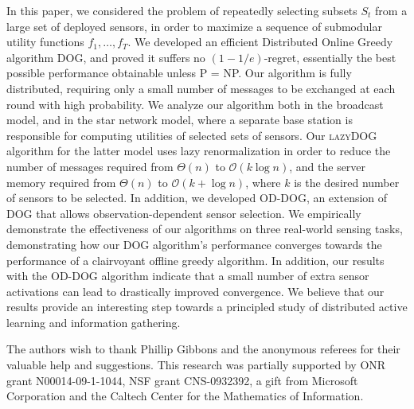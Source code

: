 \documentclass{sig-alternate-dan}
\numberwithin{equation}{section}
\newcommand{\algofont}[1]{\textsc{#1}}
\newcommand{\cO}{\mathcal{O}}
\newcommand{\oddog}{\algofont{OD-DOG}\xspace}
\newcommand{\dog}{\algofont{DOG}\xspace}
\newcommand{\lazydog}{\algofont{lazyDOG}\xspace}
\newcommand{\obj}{\ensuremath{f}} %
\newcommand{\K}{\ensuremath{k}}
\renewcommand{\paragraph}[1]{\vspace{3mm}\noindent{\bf #1.} }
\begin{document}
In this paper, we considered the problem of repeatedly selecting
subsets $S_{t}$ from a large set of deployed sensors, in order to
maximize a sequence of submodular utility functions
$\obj_{1},\dots,\obj_{T}$. We developed an efficient Distributed
Online Greedy algorithm \dog, and proved it suffers no
$(1-1/e)$-regret, essentially the best possible performance obtainable
unless P = NP.  Our algorithm is fully distributed, requiring only a
small number of messages to be exchanged at each round with high
probability.  We analyze our algorithm both in the broadcast model,
and in the star network model, where a separate base station is
responsible for computing utilities of selected sets of sensors.  Our
\lazydog algorithm for the latter model uses lazy renormalization in
order to reduce the number of messages required from $\Theta(n)$ to
$\cO(\K\log n)$, and the server memory required from $\Theta(n)$ to
$\cO(\K + \log n)$, where $\K$ is the desired number of sensors to be
selected.  In addition, we developed \oddog, an extension of \dog that
allows observation-dependent sensor selection.  We empirically
demonstrate the effectiveness of our algorithms on three real-world
sensing tasks, demonstrating how our \dog algorithm's performance
converges towards the performance of a clairvoyant offline greedy
algorithm.  In addition, our results with the \oddog algorithm
indicate that a small number of extra sensor activations can lead to
drastically improved convergence.  We believe that our results provide
an interesting step towards a principled study of distributed active
learning and information gathering.


\paragraph{Acknowledgments}  The authors wish to thank Phillip Gibbons
and the anonymous referees for their valuable help and
suggestions. This research was partially supported by ONR grant
N00014-09-1-1044, NSF grant CNS-0932392, a gift from Microsoft
Corporation and the Caltech Center for the Mathematics of Information.




%
%
%
%
%
%




%
%
{ }

{\fontsize{9}{9}

}



%

\end{document}
